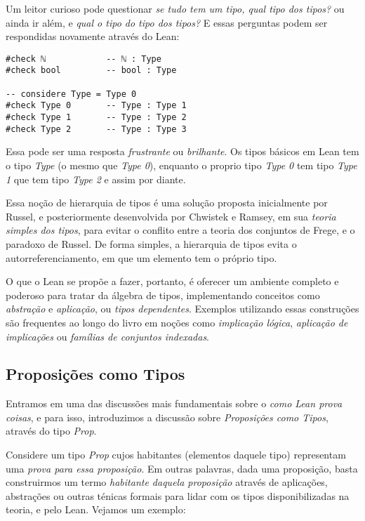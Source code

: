 Um leitor curioso pode questionar \textit{se tudo tem um tipo, qual tipo dos tipos?} ou ainda ir além, e \textit{qual o tipo do tipo dos tipos?} E essas perguntas podem ser respondidas novamente através do Lean:

\vspace{5mm}
\begin{lstlisting}
#check ℕ            -- ℕ : Type
#check bool         -- bool : Type

-- considere Type = Type 0
#check Type 0       -- Type : Type 1
#check Type 1       -- Type : Type 2
#check Type 2       -- Type : Type 3
\end{lstlisting}
\vspace{5mm}

\noindent Essa pode ser uma resposta \textit{frustrante} ou \textit{brilhante}.
Os tipos básicos em Lean tem o tipo \textit{Type} (o mesmo que \textit{Type 0}), enquanto o proprio tipo \textit{Type 0} tem tipo \textit{Type 1} que tem tipo \textit{Type 2} e assim por diante.

Essa noção de hierarquia de tipos é uma solução proposta inicialmente por Russel, e posteriormente desenvolvida por Chwistek e Ramsey, em sua \textit{teoria simples dos tipos}, para evitar o conflito entre a teoria dos conjuntos de Frege, e o paradoxo de Russel.
De forma simples, a hierarquia de tipos evita o autorreferenciamento, em que um elemento tem o próprio tipo.

O que o Lean se propõe a fazer, portanto, é oferecer um ambiente completo e poderoso para tratar da álgebra de tipos, implementando conceitos como \textit{abstração} e \textit{aplicação}, ou \textit{tipos dependentes}.
Exemplos utilizando essas construções são frequentes ao longo do livro em noções como \textit{implicação lógica}, \textit{aplicação de implicações} ou \textit{famílias de conjuntos indexadas}.

\subsection{Proposições como Tipos}
Entramos em uma das discussões mais fundamentais sobre o \textit{como Lean prova coisas}, e para isso, introduzimos a discussão sobre \textit{Proposições como Tipos}, através do tipo \textit{Prop}.

Considere um tipo \textit{Prop} cujos habitantes (elementos daquele tipo) representam uma \textit{prova para essa proposição}.
Em outras palavras, dada uma proposição, basta construirmos um termo \textit{habitante daquela proposição} através de aplicações, abstrações ou outras ténicas formais para lidar com os tipos disponibilizadas na teoria, e pelo Lean.
Vejamos um exemplo:

